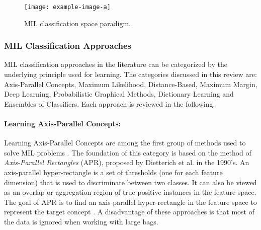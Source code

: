 \begin{center}
	\begin{figure*}[h]
		\centering
		\texttt{[image: example-image-a]}
		\caption[MIL classification space paradigm.]{MIL classification space paradigm.}
		\label{fig:mil_classification_space_paradigm}
	\end{figure*}
\end{center}

\subsubsection{MIL Classification Approaches}
MIL classification approaches in the literature can be categorized by the underlying principle used for learning.  The categories discussed in this review are: Axis-Parallel Concepts, Maximum Likelihood, Distance-Based, Maximum Margin,  Deep Learning, Probabilistic Graphical Methods, Dictionary Learning and Ensembles of Classifiers.  Each approach is reviewed in the following.

\paragraph{Learning Axis-Parallel Concepts:}
Learning Axis-Parallel Concepts are among the first group of methods used to solve MIL problems \citep{Dietterich1996AxisParallelRectangles}.  The foundation of this category is based on the method of \textit{Axis-Parallel Rectangles} (APR), proposed by Dietterich et al. in the 1990's.  An axis-parallel hyper-rectangle is a set of thresholds (one for each feature dimension) that is used to discriminate between two classes. It can also be viewed as an overlap or aggregation region of true positive instances in the feature space. The goal of APR is to find an axis-parallel hyper-rectangle in the feature space to represent the target concept \citep{Ghaffarzadegan2018MILVAE, Bocinsky2019SPIEMIACEInitialization, Jiao2017Thesis}.  A disadvantage of these approaches is that most of the data is ignored when working with large bags.    

